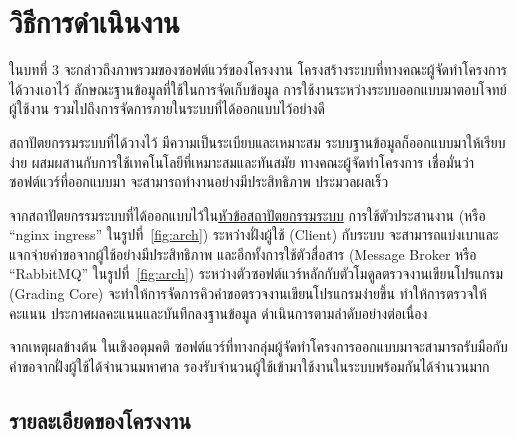 \documentclass[12pt,oneside,openright,a4paper]{cpe-thai-project}
\begin{document}
\chapter{วิธีการดำเนินงาน}



\begin{flushleft}
ในบทที่ 3 จะกล่าวถึงภาพรวมของซอฟต์แวร์ของโครงงาน โครงสร้างระบบที่ทางคณะผู้จัดทำโครงการได้วางเอาไว้ ลักษณะฐานข้อมูลที่ใช้ในการจัดเก็บข้อมูล การใช้งานระหว่างระบบออกแบบมาตอบโจทย์ผู้ใช้งาน รวมไปถึงการจัดการภายในระบบที่ได้ออกแบบไว้อย่างดี
\end{flushleft}
\begin{flushleft}
สถาปัตยกรรมระบบที่ได้วางไว้ มีความเป็นระเบียบและเหมาะสม ระบบฐานข้อมูลก็ออกแบบมาให้เรียบง่าย ผสมผสานกับการใช้เทคโนโลยีที่เหมาะสมและทันสมัย ทางคณะผู้จัดทำโครงการ เชื่อมั่นว่าซอฟต์แวร์ที่ออกแบบมา จะสามารถทำงานอย่างมีประสิทธิภาพ ประมวลผลเร็ว
\end{flushleft}
\begin{flushleft}
จากสถาปัตยกรรมระบบที่ได้ออกแบบไว้ใน\hyperlink{arch-sec}{หัวข้อสถาปัตยกรรมระบบ} การใช้ตัวประสานงาน (หรือ “nginx ingress” ในรูปที่~\ref{fig:arch}) ระหว่างฝั่งผู้ใช้ (Client) กับระบบ จะสามารถแบ่งเบาและแจกจ่ายคำขอจากผู้ใช้อย่างมีประสิทธิภาพ และอีกทั้งการใช้ตัวสื่อสาร (Message Broker หรือ “RabbitMQ” ในรูปที่~\ref{fig:arch}) ระหว่างตัวซอฟต์แวร์หลักกับตัวโมดูลตรวจงานเขียนโปรแกรม (Grading Core) จะทำให้การจัดการคิวคำขอตรวจงานเขียนโปรแกรมง่ายขึ้น  ทำให้การตรวจให้คะแนน ประกาศผลคะแนนและบันทึกลงฐานข้อมูล ดำเนินการตามลำดับอย่างต่อเนื่อง
\end{flushleft}
\begin{flushleft}
จากเหตุผลข้างต้น ในเชิงอดุมคติ ซอฟต์แวร์ที่ทางกลุ่มผู้จัดทำโครงการออกแบบมาจะสามารถรับมือกับคำขอจากฝั่งผู้ใช้ได้จำนวนมหาศาล รองรับจำนวนผู้ใช้เข้ามาใช้งานในระบบพร้อมกันได้จำนวนมาก
\end{flushleft}

\section{รายละเอียดของโครงงาน}
\end{document}
